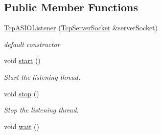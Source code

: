\subsection*{Public Member Functions}
\begin{DoxyCompactItemize}
\item 
\hyperlink{classmognetwork_1_1_tcp_a_s_i_o_listener_aae7628471fda37905fab2dc03db11f77}{Tcp\-A\-S\-I\-O\-Listener} (\hyperlink{classmognetwork_1_1_tcp_server_socket}{Tcp\-Server\-Socket} \&server\-Socket)
\begin{DoxyCompactList}\small\item\em default constructor \end{DoxyCompactList}\item 
\hypertarget{classmognetwork_1_1_tcp_a_s_i_o_listener_afd805699dfe27ceb0541feeefacc13dc}{void \hyperlink{classmognetwork_1_1_tcp_a_s_i_o_listener_afd805699dfe27ceb0541feeefacc13dc}{start} ()}\label{classmognetwork_1_1_tcp_a_s_i_o_listener_afd805699dfe27ceb0541feeefacc13dc}

\begin{DoxyCompactList}\small\item\em Start the listening thread. \end{DoxyCompactList}\item 
\hypertarget{classmognetwork_1_1_tcp_a_s_i_o_listener_ac9952961dce0f44bc720485a4e4e620d}{void \hyperlink{classmognetwork_1_1_tcp_a_s_i_o_listener_ac9952961dce0f44bc720485a4e4e620d}{stop} ()}\label{classmognetwork_1_1_tcp_a_s_i_o_listener_ac9952961dce0f44bc720485a4e4e620d}

\begin{DoxyCompactList}\small\item\em Stop the listening thread. \end{DoxyCompactList}\item 
\hypertarget{classmognetwork_1_1_tcp_a_s_i_o_listener_ae6327f6471291ba5107c0a9c3362b929}{void \hyperlink{classmognetwork_1_1_tcp_a_s_i_o_listener_ae6327f6471291ba5107c0a9c3362b929}{wait} ()}\label{classmognetwork_1_1_tcp_a_s_i_o_listener_ae6327f6471291ba5107c0a9c3362b929}


\end{DoxyCompactItemize}
